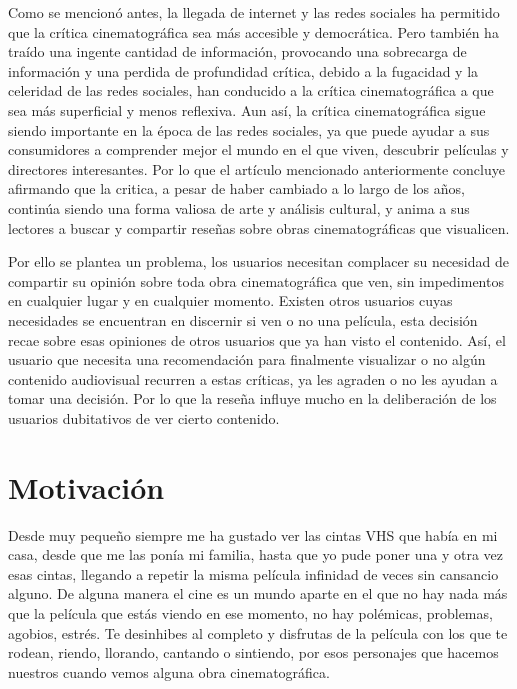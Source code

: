 Como se mencionó antes, la llegada de internet y las redes sociales ha permitido que la crítica 
cinematográfica sea más accesible y democrática. Pero también ha traído una ingente cantidad de 
información, provocando una sobrecarga de información y una perdida de profundidad crítica, debido a la 
fugacidad y la celeridad de las redes sociales, han conducido a la crítica cinematográfica a que sea 
más superficial y menos reflexiva. Aun así, la crítica cinematográfica sigue siendo importante en la 
época de las redes sociales, ya que puede ayudar a sus consumidores a comprender mejor el mundo en el 
que viven, descubrir películas y directores interesantes. Por lo que el artículo mencionado 
anteriormente concluye afirmando que la critica, a pesar de haber cambiado a lo largo de los años, 
continúa siendo una forma valiosa de arte y análisis cultural, y anima a sus lectores a buscar y 
compartir reseñas sobre obras cinematográficas que visualicen.

Por ello se plantea un problema, los usuarios necesitan complacer su necesidad de compartir su opinión sobre toda obra cinematográfica que ven, sin impedimentos en cualquier lugar y en cualquier momento. Existen otros usuarios cuyas necesidades se encuentran en discernir si ven o no una película, esta decisión recae sobre esas opiniones de otros usuarios que ya han visto el contenido. Así, el usuario que necesita una recomendación para finalmente visualizar o no algún contenido audiovisual recurren a estas críticas, ya les agraden o no les ayudan a tomar una decisión. Por lo que la reseña influye mucho en la deliberación de los usuarios dubitativos de ver cierto contenido.

\section{Motivación}

Desde muy pequeño siempre me ha gustado ver las cintas VHS que había en mi casa, desde que me las ponía 
mi familia, hasta que yo pude poner una y otra vez esas cintas, llegando a repetir la misma película 
infinidad de veces sin cansancio alguno. De alguna manera el cine es un mundo aparte en el que no hay 
nada más que la película que estás viendo en ese momento, no hay polémicas, problemas, agobios, estrés. 
Te desinhibes al completo y disfrutas de la película con los que te rodean, riendo, llorando, cantando 
o sintiendo, por esos personajes que hacemos nuestros cuando vemos alguna obra cinematográfica. 

